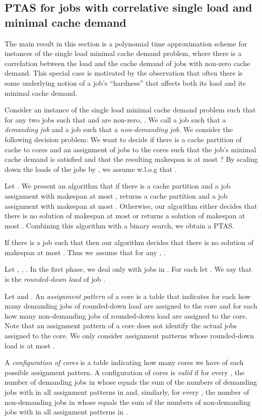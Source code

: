 \documentclass[11pt]{article}
\begin{document}
\subsection{PTAS for jobs with correlative single load and minimal cache demand}\label{correl_ptas}

The main result in this section is a polynomial time approximation scheme for instances of the single load minimal cache demand problem, where there is a correlation between the load and the cache demand of jobs with non-zero cache demand. This special case is motivated by the observation that often there is some underlying notion of a job's ``hardness'' that affects both its load and its minimal cache demand.

Consider an instance of the single load minimal cache demand problem such that for any two jobs  such that  and  are non-zero, .
We call a job  such that  a \textit{demanding job} and a job  such that  a \textit{non-demanding job}.
We consider the following decision problem:
We want to decide if there is a cache partition of  cache to  cores and an assignment of jobs to the cores such that the job's minimal cache demand is satisfied and that the resulting makespan is at most ? By scaling down the loads of the jobs by , we assume w.l.o.g that .

Let . We present an algorithm that if there is a cache partition and a job assignment with makespan at most , returns a cache partition and a job assignment with makespan at most .
Otherwise, our algorithm either decides that there is no solution of makespan at most  or returns a solution of makespan at most .
Combining this algorithm with a binary search, we obtain a PTAS.

If there is a job  such that  then our algorithm decides that there is no solution of makespan at most .
Thus we assume that for any , .

Let , , .
In the first phase, we deal only with jobs in .
For each  let .
We say that  is the \textit{rounded-down load} of job .

Let  and .
An \textit{assignment pattern} of a core is a table that indicates for each  how many demanding jobs of rounded-down load  are assigned to the core and for each  how many non-demanding jobs of rounded-down load  are assigned to the core.
Note that an assignment pattern of a core does not identify the actual jobs assigned to the core.
We only consider assignment patterns whose rounded-down load is at most .

A \textit{configuration of cores} is a table indicating how many cores we have of each possible assignment pattern.
A configuration of cores  is \textit{valid} if for every , the number of demanding jobs in  whose  equals the sum of the numbers of demanding jobs with  in all assignment patterns in  and, similarly, for every , the number of non-demanding jobs in  whose  equals the sum of the numbers of non-demanding jobs with  in all assignment patterns in .
\end{document}
